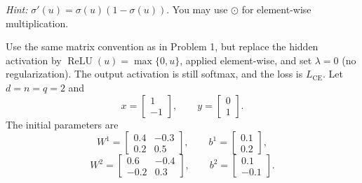 \documentclass[12pt,letterpaper,onecolumn]{exam}
\begin{document}
\begin{questions}
    \textit{Hint:} $\sigma'(u)=\sigma(u)(1-\sigma(u))$.
    You may use $\odot$ for element-wise multiplication.

    \begin{solution}
        \begin{parts}
            \part
            \part
            \part
        \end{parts}
    \end{solution}

    \newpage
    \question
    Use the same matrix convention as in Problem 1, but replace the
    hidden activation by $\operatorname{ReLU}(u)=\max\{0,u\}$,
    applied element-wise, and set $\lambda=0$ (no regularization).
    The output activation is still softmax, and the loss is
    $L_{\mathrm{CE}}$. Let $d=n=q=2$ and
    \[
        x=\begin{bmatrix}1\\-1\end{bmatrix},\qquad
        y=\begin{bmatrix}0\\1\end{bmatrix}.
    \]
    The initial parameters are
    \[
        W^1=\begin{bmatrix}0.4&-0.3\\0.2&0.5\end{bmatrix},
        \qquad b^1=\begin{bmatrix}0.1\\0.2\end{bmatrix},
    \]
    \[
        W^2=\begin{bmatrix}0.6&-0.4\\-0.2&0.3\end{bmatrix},
        \qquad b^2=\begin{bmatrix}0.1\\-0.1\end{bmatrix}.
    \]
    \begin{parts}

\end{parts}
\end{questions}
\end{document}
